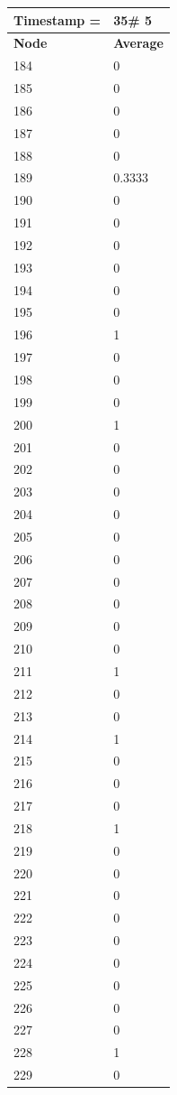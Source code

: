 \begin{tabular}{|l||l|}
\hline
\textbf{Timestamp =} & \textbf{35}\# 5\\\hline
	\textbf{Node} & \textbf{Average} \\ \hline
\hline
	184 & 0 \\ \hline
	185 & 0 \\ \hline
	186 & 0 \\ \hline
	187 & 0 \\ \hline
	188 & 0 \\ \hline
	189 & 0.3333 \\ \hline
	190 & 0 \\ \hline
	191 & 0 \\ \hline
	192 & 0 \\ \hline
	193 & 0 \\ \hline
	194 & 0 \\ \hline
	195 & 0 \\ \hline
	196 & 1 \\ \hline
	197 & 0 \\ \hline
	198 & 0 \\ \hline
	199 & 0 \\ \hline
	200 & 1 \\ \hline
	201 & 0 \\ \hline
	202 & 0 \\ \hline
	203 & 0 \\ \hline
	204 & 0 \\ \hline
	205 & 0 \\ \hline
	206 & 0 \\ \hline
	207 & 0 \\ \hline
	208 & 0 \\ \hline
	209 & 0 \\ \hline
	210 & 0 \\ \hline
	211 & 1 \\ \hline
	212 & 0 \\ \hline
	213 & 0 \\ \hline
	214 & 1 \\ \hline
	215 & 0 \\ \hline
	216 & 0 \\ \hline
	217 & 0 \\ \hline
	218 & 1 \\ \hline
	219 & 0 \\ \hline
	220 & 0 \\ \hline
	221 & 0 \\ \hline
	222 & 0 \\ \hline
	223 & 0 \\ \hline
	224 & 0 \\ \hline
	225 & 0 \\ \hline
	226 & 0 \\ \hline
	227 & 0 \\ \hline
	228 & 1 \\ \hline
	229 & 0 \\ \hline
\end{tabular}
